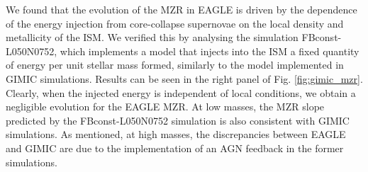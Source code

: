 \documentclass[useAMS,usenatbib]{mn2e}
\begin{document}
We found that the evolution of the MZR in EAGLE is driven by the dependence of
the energy injection from core-collapse supernovae on the local density and metallicity of the ISM.
We verified this by analysing the simulation FBconst-L050N0752, which implements a model that
injects into the ISM a fixed quantity of energy per unit stellar mass formed, 
similarly to the model implemented in {\sc GIMIC} simulations.  Results can be seen in 
the right panel of Fig. \ref{fig:gimic_mzr}.  Clearly, when the injected energy is independent of
local conditions, we obtain a negligible evolution for the {\sc EAGLE} MZR.
At low masses, the MZR slope predicted by the FBconst-L050N0752 simulation is also consistent with {\sc GIMIC} simulations.
As mentioned, at high masses, the discrepancies between {\sc EAGLE} and {\sc GIMIC} are due to the
implementation of an AGN feedback in the former simulations.
\end{document}
